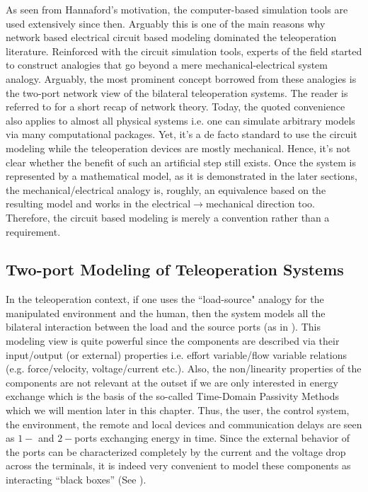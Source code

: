 As seen from Hannaford's motivation, the computer-based simulation tools are used extensively since then. Arguably
this is one of the main reasons why network based electrical circuit based modeling dominated the teleoperation literature. 
Reinforced with the circuit simulation tools, experts of the field started to construct analogies that go beyond
a mere mechanical-electrical system analogy. Arguably, the most prominent concept borrowed from these analogies is the two-port network 
view of the bilateral teleoperation systems. The reader is referred to  for a short recap of network theory.
Today, the quoted convenience also applies to almost all physical systems i.e. one can simulate arbitrary models via many 
computational packages. Yet, it's a de facto standard to use the circuit modeling while the teleoperation devices are mostly 
mechanical. Hence, it's not clear whether the benefit of such an artificial step still exists. Once the system is represented 
by a mathematical model, as it is demonstrated in the later sections, the mechanical/electrical analogy is, roughly, an equivalence
based on the resulting model and works in the electrical$\to$mechanical direction too. Therefore, the 
circuit based modeling is merely a convention rather than a requirement.

\subsection{Two-port Modeling of Teleoperation Systems}

In the teleoperation context, if one uses the ``load-source" analogy for the manipulated environment 
and the human, then the system models all the bilateral interaction between the load and the source 
ports (as in ). This modeling view is quite powerful since the components are described via their input/output 
(or external) properties i.e. effort variable/flow variable relations (e.g. force/velocity, voltage/current etc.). Also, the non/linearity
properties of the components are not relevant at the outset if we are only interested in energy exchange which is the basis
of the so-called Time-Domain Passivity Methods \cite{hannafordryu} which we will mention later in this chapter. Thus, 
the user, the control system, the environment, the remote and local devices and communication delays are seen as 
$1-$ and $2-$ports exchanging energy in time. Since the external behavior of the ports can be characterized completely by the 
current and the voltage drop across the terminals, it is indeed very convenient to model these components as 
interacting ``black boxes'' (See ).


